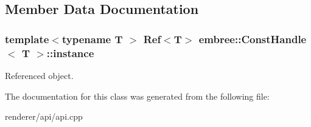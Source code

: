 \subsection{Member Data Documentation}
\hypertarget{classembree_1_1_const_handle_ab3edd1f8238479acc7b2ecb408937b59}{
\subsubsection[{instance}]{\setlength{\rightskip}{0pt plus 5cm}template$<$typename T $>$ Ref$<$T$>$ {\bf embree::ConstHandle}$<$ T $>$::{\bf instance}}}
\label{classembree_1_1_const_handle_ab3edd1f8238479acc7b2ecb408937b59}


Referenced object. 



The documentation for this class was generated from the following file:\begin{DoxyCompactItemize}
\item 
renderer/api/api.cpp\end{DoxyCompactItemize}
